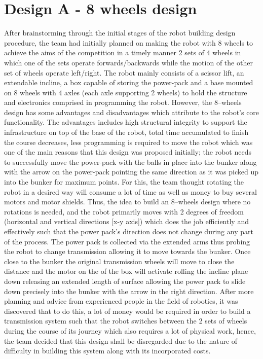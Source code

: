 \documentclass[12pt]{report}
\begin{document}
\section{Design A - 8 wheels design}
After brainstorming through the initial stages of the robot building design procedure, the team had initially planned on making the robot with 8 wheels to achieve the aims of the competition in a timely manner {2 sets of 4 wheels in which one of the sets operate forwards/backwards while the motion of the other set of wheels operate left/right}. The robot mainly consists of a scissor lift, an extendable incline, a box capable of storing the power-pack and a base mounted on 8 wheels with 4 axles (each axle supporting 2 wheels) to hold the structure and electronics comprised in programming the robot. 
However, the 8–wheels design has some advantages and disadvantages which attribute to the robot’s core functionality.  The advantages includes high structural integrity to support the infrastructure on top of the base of the robot, total time accumulated to finish the course decreases, less programming is required to move the robot which was one of the main reasons that this design was proposed initially; the robot needs to successfully move the power-pack with the balls in place into the bunker along with the arrow on the power-pack pointing the same direction as it was picked up into the bunker for maximum points. For this, the team thought rotating the robot in a desired way will consume a lot of time as well as money to buy several motors and motor shields. Thus, the idea to build an 8–wheels design where no rotations is needed, and the robot primarily moves with 2 degrees of freedom (horizontal and vertical directions [x-y axis]) which does the job efficiently and effectively such that the power pack’s direction does not change during any part of the process. The power pack is collected via the extended arms thus probing the robot to change transmission allowing it to move towards the bunker. Once close to the bunker the original transmission wheels will move to close the distance and the motor on the of the box will activate rolling the incline plane down releasing an extended length of surface allowing the power pack to slide down precisely into the bunker with the arrow in the right direction. 
After more planning and advice from experienced people in the field of robotics, it was discovered that to do this, a lot of money would be required in order to build a transmission system such that the robot switches between the 2 sets of wheels during the course of its journey which also requires a lot of physical work, hence, the team decided that this design shall be disregarded due to the nature of difficulty in building this system along with its incorporated costs.
\end{document}
